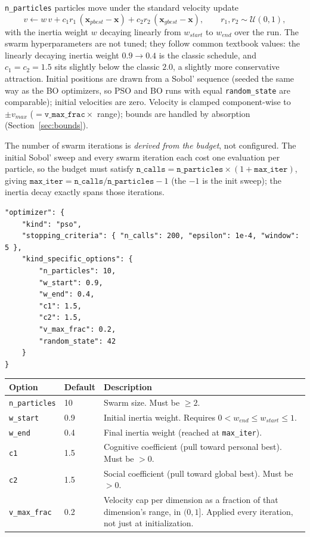 \texttt{n\_particles} particles move under the standard
velocity update
\[
v \leftarrow w\,v
  + c_1 r_1 \,(\mathbf{x}_{pbest} - \mathbf{x})
  + c_2 r_2 \,(\mathbf{x}_{gbest} - \mathbf{x}),
\qquad r_1, r_2 \sim \mathcal{U}(0,1),
\]
with the inertia weight $w$ decaying linearly from $w_{start}$ to $w_{end}$
over the run.  The swarm hyperparameters are not tuned; they follow common
textbook values: the linearly decaying inertia weight $0.9 \to 0.4$ is the
classic schedule, and $c_1 = c_2 = 1.5$ sits slightly below the classic
$2.0$, a slightly more conservative attraction.  Initial positions are drawn from a Sobol' sequence (seeded the
same way as the BO optimizers, so PSO and BO runs with equal
\texttt{random\_state} are comparable); initial velocities are zero.
Velocity is clamped component-wise to $\pm v_{max}$
($= \texttt{v\_max\_frac} \times$ range); bounds are handled by absorption
(Section~\ref{sec:bounds}).

The number of swarm iterations is \emph{derived from the budget}, not
configured.  The initial Sobol' sweep and every swarm iteration each cost
one evaluation per particle, so the budget must satisfy
$\texttt{n\_calls} = \texttt{n\_particles} \times (1 + \texttt{max\_iter})$,
giving $\texttt{max\_iter} = \texttt{n\_calls} / \texttt{n\_particles} - 1$
(the $-1$ is the init sweep); the inertia decay exactly spans those
iterations.

\begin{lstlisting}
"optimizer": {
    "kind": "pso",
    "stopping_criteria": { "n_calls": 200, "epsilon": 1e-4, "window": 5 },
    "kind_specific_options": {
        "n_particles": 10,
        "w_start": 0.9,
        "w_end": 0.4,
        "c1": 1.5,
        "c2": 1.5,
        "v_max_frac": 0.2,
        "random_state": 42
    }
}
\end{lstlisting}

\begin{center}
\begin{tabular}{@{}llp{8.5cm}@{}}
\toprule
Option & Default & Description \\
\midrule
\texttt{n\_particles} & 10 & Swarm size. Must be $\geq 2$. \\
\texttt{w\_start} & 0.9 & Initial inertia weight. Requires
$0 < w_{end} \leq w_{start} \leq 1$. \\
\texttt{w\_end} & 0.4 & Final inertia weight (reached at
\texttt{max\_iter}). \\
\texttt{c1} & 1.5 & Cognitive coefficient (pull toward personal best).
Must be $>0$. \\
\texttt{c2} & 1.5 & Social coefficient (pull toward global best).
Must be $>0$. \\
\texttt{v\_max\_frac} & 0.2 & Velocity cap per dimension as a fraction of
that dimension's range, in $(0,1]$.  Applied every iteration, not just at
initialization. \\
\bottomrule
\end{tabular}
\end{center}

